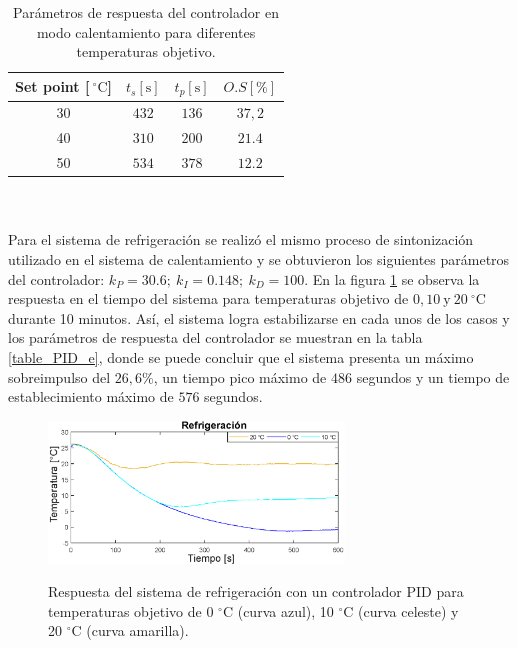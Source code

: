 \begin{table}[htbp]
\caption{Parámetros de respuesta del controlador en modo calentamiento para diferentes temperaturas objetivo.}
    \label{table_PID_c}
	\centering
	\begin{tabular}{ c  c  c c}
    \hline
    Set point [$~^\circ \mbox{C}$]       & $t_s [\mbox{s}]$    & $t_p[\mbox{s}]$     &  $O.S[\%]$    \\ \hline
    \multicolumn{1}{c}{30}      & $432$        & $136$        & $37,2$    \\
    \multicolumn{1}{c}{40}      & $310$        & $200$        & $21.4$   \\
    \multicolumn{1}{c}{50}      & $534$        & $378$        & $12.2$   \\ \hline
	\end{tabular}
\end{table}
\\ \\
Para el sistema de refrigeración se realizó el mismo proceso de sintonización utilizado en el sistema de calentamiento y se obtuvieron los siguientes parámetros del controlador: $k_P= 30.6;~k_I= 0.148;~k_D=100$. En la figura \ref{fig:Respuesta_PID_e} se observa la respuesta en el tiempo del sistema para temperaturas objetivo de $0, 10 ~\mbox{y}~20~^\circ\mbox{C}$ durante 10 minutos. Así, el sistema logra estabilizarse en cada unos de los casos y los parámetros de respuesta del controlador se muestran en la tabla \ref{table_PID_e}, donde se puede concluir que el sistema presenta un máximo sobreimpulso del $26,6\%$, un tiempo pico máximo de $486$ segundos y un tiempo de establecimiento máximo de $576$ segundos.\\
\begin{figure}[h!]
\begin{centering}
    \caption{Respuesta del sistema de refrigeración con un controlador PID para temperaturas objetivo de 0 $^\circ $C (curva azul), 10 $^\circ $C (curva celeste) y 20 $^\circ $C (curva amarilla).}
    \includegraphics[width=0.7\textwidth]{Images/PID_enfriamiento.eps}
    \label{fig:Respuesta_PID_e}
  \par\end{centering}
\end{figure}

